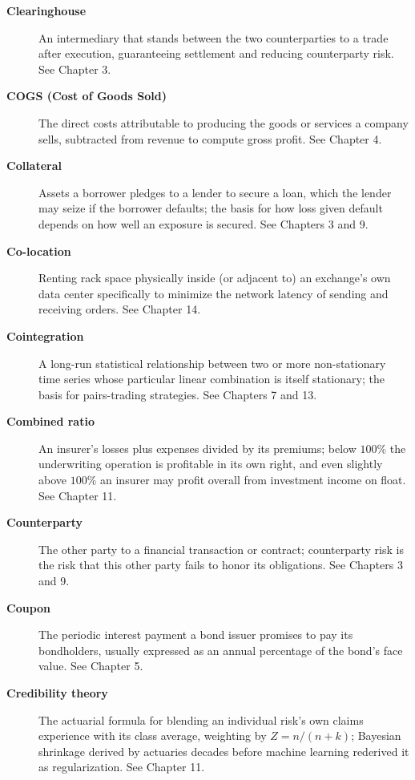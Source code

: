 \documentclass[../ai_in_finance]{subfiles}
\begin{document}
\begin{description}
\item[\textbf{Clearinghouse}] An intermediary that stands between the two counterparties to a trade after execution, guaranteeing settlement and reducing counterparty risk. See Chapter 3.

\item[\textbf{COGS (Cost of Goods Sold)}] The direct costs attributable to producing the goods or services a company sells, subtracted from revenue to compute gross profit. See Chapter 4.

\item[\textbf{Collateral}] Assets a borrower pledges to a lender to secure a loan, which the lender may seize if the borrower defaults; the basis for how loss given default depends on how well an exposure is secured. See Chapters 3 and 9.

\item[\textbf{Co-location}] Renting rack space physically inside (or adjacent to) an exchange's own data center specifically to minimize the network latency of sending and receiving orders. See Chapter 14.

\item[\textbf{Cointegration}] A long-run statistical relationship between two or more non-stationary time series whose particular linear combination is itself stationary; the basis for pairs-trading strategies. See Chapters 7 and 13.

\item[\textbf{Combined ratio}] An insurer's losses plus expenses divided by its premiums; below $100\%$ the underwriting operation is profitable in its own right, and even slightly above $100\%$ an insurer may profit overall from investment income on float. See Chapter 11.

\item[\textbf{Counterparty}] The other party to a financial transaction or contract; counterparty risk is the risk that this other party fails to honor its obligations. See Chapters 3 and 9.

\item[\textbf{Coupon}] The periodic interest payment a bond issuer promises to pay its bondholders, usually expressed as an annual percentage of the bond's face value. See Chapter 5.

\item[\textbf{Credibility theory}] The actuarial formula for blending an individual risk's own claims experience with its class average, weighting by $Z = n/(n+k)$; Bayesian shrinkage derived by actuaries decades before machine learning rederived it as regularization. See Chapter 11.


\end{description}
\end{document}
